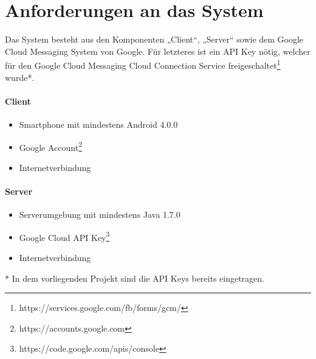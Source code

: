 
\section{Anforderungen an das System}

Das System besteht aus den Komponenten „Client“, „Server“ sowie dem Google Cloud Messaging System von Google. Für letzteres ist ein API Key nötig, welcher für den Google Cloud Messaging Cloud Connection Service freigeschaltet\footnote{https://services.google.com/fb/forms/gcm/} wurde*.\\


\paragraph{Client}

\begin{itemize}
	\item Smartphone mit mindestens Android 4.0.0
	\item Google Account\footnote{https://accounts.google.com}
	\item Internetverbindung
\end{itemize}

\paragraph{Server}

\begin{itemize}
	\item Serverumgebung mit mindestens Java 1.7.0
	\item Google Cloud API Key\footnote{https://code.google.com/apis/console‎}
	\item Internetverbindung
\end{itemize}

* In dem vorliegenden Projekt sind die API Keys bereits eingetragen.
